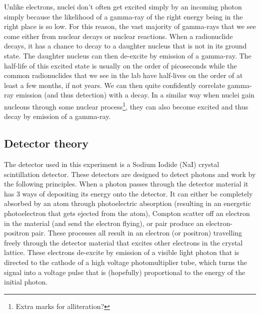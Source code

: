 \documentclass[11pt]{article}
\numberwithin{equation}{section}
\numberwithin{figure}{section}
\numberwithin{table}{section}
\begin{document}
Unlike electrons, nuclei don't often get excited simply by an incoming photon simply because the likelihood of a gamma-ray of the right energy being in the right place is so low. For this reason, the vast majority of gamma-rays that we see come either from nuclear decays or nuclear reactions. When a radionuclide decays, it has a chance to decay to a daughter nucleus that is not in its ground state. The daughter nucleus can then de-excite by emission of a gamma-ray. The half-life of this excited state is usually on the order of picoseconds while the common radionuclides that we see in the lab have half-lives on the order of at least a few months, if not years. We can then quite confidently correlate gamma-ray emission (and thus detection) with a decay. In a similar way when nuclei gain nucleons through some nuclear process\footnote[1]{Extra marks for alliteration?}, they can also become excited and thus decay by emission of a gamma-ray. 

\subsection{Detector theory}\label{sec:DetectorTheory}
The detector used in this experiment is a Sodium Iodide (NaI) crystal scintillation detector. These detectors are designed to detect photons and work by the following principles. When a photon passes through the detector material it has 3 ways of depositing its energy onto the detector. It can either be completely absorbed by an atom through photoelectric absorption (resulting in an energetic photoelectron that gets ejected from the atom), Compton scatter off an electron in the material (and send the electron flying), or pair produce an electron-positron pair. These processes all result in an electron (or positron) travelling freely through the detector material that excites other electrons in the crystal lattice. These electrons de-excite by emission of a visible light photon that is directed to the cathode of a high voltage photomultiplier tube, which turns the signal into a voltage pulse that is (hopefully) proportional to the energy of the initial photon.
\end{document}
